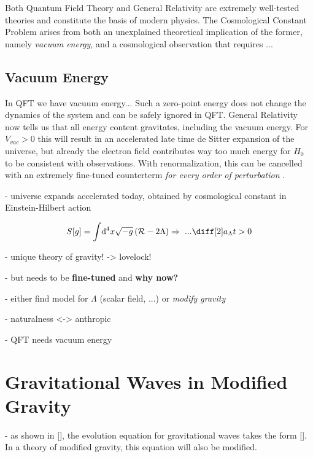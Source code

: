 \documentclass[parskip=half]{scrreprt}
\begin{document}
Both Quantum Field Theory and General Relativity are extremely well-tested theories and constitute the basis of modern physics. %
The Cosmological Constant Problem arises from both an unexplained theoretical implication of the former, namely \emph{vacuum energy}, and a cosmological observation that requires ...

\subsection{Vacuum Energy}

In QFT we have vacuum energy... %
Such a zero-point energy does not change the dynamics of the system and can be safely ignored in QFT. %
General Relativity now tells us that all energy content gravitates, including the vacuum energy. %
For $V_{vac}>0$ this will result in an accelerated late time de Sitter expansion of the universe, but already the electron field contributes way too much energy for $H_0$ to be consistent with observations. With renormalization, this can be cancelled with an extremely fine-tuned counterterm \emph{for every order of perturbation} \citep{Datta1996}. %


- universe expands accelerated today, obtained by cosmological constant in Einstein-Hilbert action

\begin{align}\label{eq:einstein_hilbert_action_cc}
	S[g] = \int \! \mathrm{d}^4 x \sqrt{-g} \left( \Rscal - 2\Lambda \right)
	\Rightarrow \; ... \ddt{a_\Lambda} > 0
\end{align}

- unique theory of gravity! -> lovelock!

- but needs to be \textbf{fine-tuned} and \textbf{why now?}

- either find model for $\Lambda$ (scalar field, ...) or \emph{modify gravity}

- naturalness <-> anthropic \cite{Datta1996}

- QFT needs vacuum energy

\section{Gravitational Waves in Modified Gravity}\label{sec:grav_waves_mod}

- as shown in [], the evolution equation for gravitational waves takes the form []. In a theory of modified gravity, this equation will also be modified.
\end{document}

